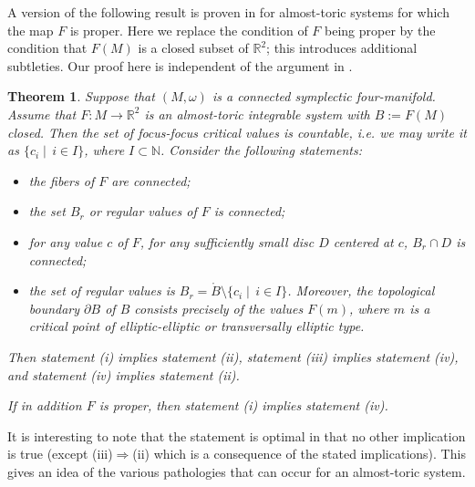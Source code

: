 \documentclass[11pt]{article}
\newtheorem{theorem}{Theorem}[section]
\newcommand{\R}{{\mathbb R}}
\newcommand{\impliq}{\Rightarrow}
\newcommand{\NM}{\mathbb{N}}
\begin{document}
A version of the following result is proven in \cite{VN2007} for
almost-toric systems for which the map $F $ is proper. Here we replace
the condition of $F$ being proper by the condition that $F(M)$ is a
closed subset of $\mathbb{R}^2$; this introduces additional
subtleties. Our proof here is independent of the argument in
\cite{VN2007}.

\begin{theorem}
  \label{theo:interior}
  Suppose that $(M, \omega)$ is a connected symplectic four-manifold.
  Assume that $F \colon M \to \R^2$ is an almost\--toric integrable
  system with $B:=F(M)$ closed. Then the set of focus\--focus critical
  values is countable, i.e. we may write it as $\{c_i\mid\, i\in I\}$,
  where $I\subset \NM$. Consider the following statements:
  \begin{itemize}
  \item[{\rm (i)}] the fibers of $F$ are connected;
  \item[{\rm (ii)}] the set $B_r$ or regular values of $F$ is
    connected;
  \item[{\rm (iii)}] for any value $c$ of $F$, for any sufficiently
    small disc $D$ centered at $c$, $B_r\cap D$ is connected;
  \item[{\rm (iv)}] the set of regular values
    is $B_r=\mathring{B}\setminus\{c_i\mid\, i\in I\}$.
    Moreover, the topological boundary $\partial B $ of $B$ consists
    precisely of the values $F(m)$, where $m$ is a critical point of
    elliptic-elliptic or transversally elliptic type.
  \end{itemize}
  Then statement {\rm (i)} implies statement {\rm (ii)}, statement
  {\rm (iii)} implies statement {\rm (iv)}, and statement {\rm (iv)}
  implies statement {\rm (ii)}.

  If in addition $F$ is proper, then statement \textup{(i)} implies
  statement \textup{(iv)}.
  
  
\end{theorem}
It is interesting to note that the statement is optimal in that no
other implication is true (except \textup{(iii)}$\impliq$\textup{(ii)}
which is a consequence of the stated implications). This gives an idea
of the various pathologies that can occur for an almost-toric system.
\end{document}
